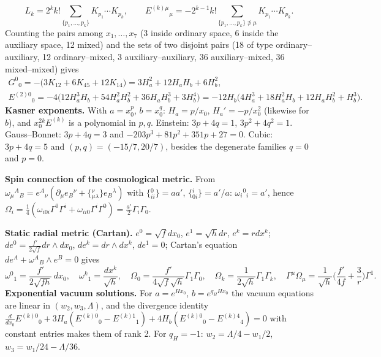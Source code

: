 \documentclass[10pt,a4paper]{article}
\begin{document}
\begin{equation*}
L_k=2^kk!\sum_{\{p_1,\dots,p_k\}}K_{p_1}\cdots K_{p_k},\qquad E^{(k)\mu}{}_\mu=-2^{k-1}k!\sum_{\{p_1,\dots,p_k\}\not\ni\mu}K_{p_1}\cdots K_{p_k}.
\end{equation*}
Counting the pairs among $x_1,\dots,x_7$ (3 inside ordinary space, 6 inside the auxiliary space, 12 mixed) and the sets of two disjoint pairs (18 of type ordinary–auxiliary, 12 ordinary–mixed, 3 auxiliary–auxiliary, 36 auxiliary–mixed, 36 mixed–mixed) gives
\begin{gather*}
G^0{}_0=-\big(3K_{12}+6K_{45}+12K_{14}\big)=3H_a^2+12H_aH_b+6H_b^2,\\ E^{(2)0}{}_0=-4\big(12H_a^3H_b+54H_a^2H_b^2+36H_aH_b^3+3H_b^4\big)=-12H_b\big(4H_a^3+18H_a^2H_b+12H_aH_b^2+H_b^3\big).
\end{gather*}
\textbf{Kasner exponents.} With $a=x_0^p$, $b=x_0^q$: $H_a=p/x_0$, $H_a'=-p/x_0^2$ (likewise for $b$), and $x_0^{2k}E^{(k)}$ is a polynomial in $p,q$. Einstein: $3p+4q=1$, $3p^2+4q^2=1$. Gauss–Bonnet: $3p+4q=3$ and $-203p^3+81p^2+351p+27=0$. Cubic: $3p+4q=5$ and $(p,q)=(-15/7,20/7)$, besides the degenerate families $q=0$ and $p=0$.

\textbf{Spin connection of the cosmological metric.} From $\omega_\mu{}^A{}_B=e^A{}_\nu(\partial_\mu e_B{}^\nu+\{{}^\nu_{\mu\lambda}\}e_B{}^\lambda)$ with $\{{}^0_{ii}\}=aa'$, $\{{}^i_{0i}\}=a'/a$: $\omega_i{}^0{}_i=a'$, hence $\Omega_i=\tfrac14(\omega_{i0i}\Gamma^0\Gamma^i+\omega_{ii0}\Gamma^i\Gamma^0)=\tfrac{a'}{2}\Gamma_i\Gamma_0$.

\textbf{Static radial metric (Cartan).} $e^0=\sqrt f dx_0$, $e^1=\sqrt h dr$, $e^k=r dx^k$; $de^0=\frac{f'}{2\sqrt f}dr\wedge dx_0$, $de^k=dr\wedge dx^k$, $de^1=0$; Cartan’s equation $de^A+\omega^A{}_B\wedge e^B=0$ gives
\begin{equation*}
\omega^0{}_1=\frac{f'}{2\sqrt{fh}}\,dx_0,\quad \omega^k{}_1=\frac{dx^k}{\sqrt h},\quad \Omega_0=\frac{f'}{4\sqrt f\sqrt h}\Gamma_1\Gamma_0,\quad \Omega_k=\frac{1}{2\sqrt h}\Gamma_1\Gamma_k,\quad \Gamma^\mu\Omega_\mu=\frac{1}{\sqrt h}\Big(\frac{f'}{4f}+\frac3r\Big)\Gamma^1 .
\end{equation*}
\textbf{Exponential vacuum solutions.} For $a=e^{Hx_0}$, $b=e^{q_HHx_0}$ the vacuum equations are linear in $(w_2,w_3,\Lambda)$, and the divergence identity $\frac{d}{dx_0}E^{(k)0}{}_0+3H_a(E^{(k)0}{}_0-E^{(k)1}{}_1)+4H_b(E^{(k)0}{}_0-E^{(k)4}{}_4)=0$ with constant entries makes them of rank 2. For $q_H=-1$: $w_2=\Lambda/4-w_1/2$, $w_3=w_1/24-\Lambda/36$.
\end{document}
